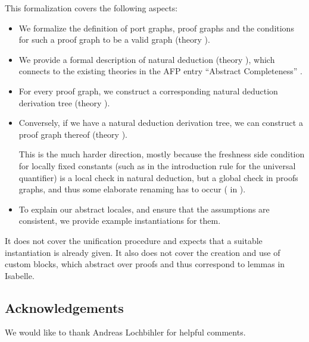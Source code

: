 \documentclass[11pt,DIV16,a4paper,parskip=half]{scrartcl}
\begin{document}
This formalization covers the following aspects:
\begin{itemize}
\item We formalize the definition of port graphs, proof graphs and the conditions for such a proof
      graph to be a valid graph (theory ).
\item We provide a formal description of natural deduction (theory ), 
      which connects to the existing theories in the AFP entry “Abstract
      Completeness” \cite{Abstract_Completeness-AFP}.
\item For every proof graph, we construct a corresponding natural deduction derivation tree
      (theory  ).
\item Conversely, if we have a natural deduction derivation tree, we can construct a proof graph
      thereof (theory ).
      
      This is the much harder direction, mostly because the freshness side condition for locally
      fixed constants (such as in the introduction rule for the universal quantifier) is a local
      check in natural deduction, but a global check in proofs graphs, and thus some elaborate
      renaming has to occur ( in ).
\item To explain our abstract locales, and ensure that the assumptions are consistent, we provide
      example instantiations for them.
\end{itemize}

It does not cover the unification procedure and expects that a suitable instantiation is already
given. It also does not cover the creation and use of custom blocks, which abstract over proofs and thus correspond to lemmas in Isabelle.


\subsection*{Acknowledgements}

We would like to thank Andreas Lochbihler for helpful comments.




\clearpage
\newcommand{\theory}[1]{\subsection{#1}\label{sec\string_#1}}
\end{document}
